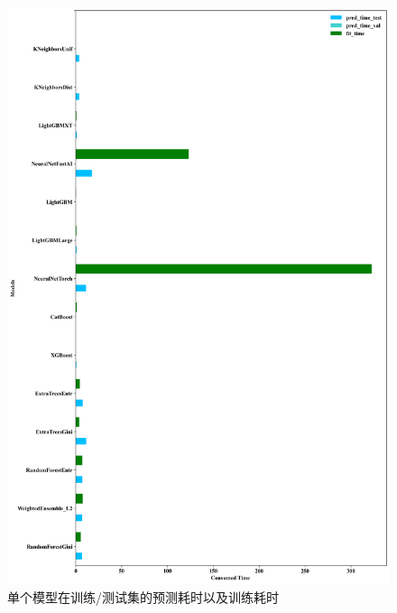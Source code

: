 \documentclass[withoutpreface,bwprint]{cumcmthesis} %
\begin{document}
    
    \begin{figure}[H]

        \centering
        \includegraphics[scale=0.4]{images/times_score.png}
        \caption{单个模型在训练/测试集的预测耗时以及训练耗时}
        \label{fig3}


    \end{figure}

\end{document}
